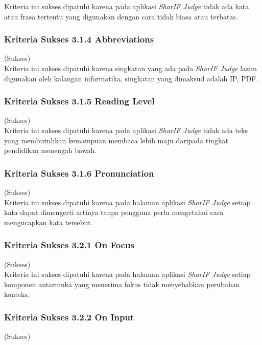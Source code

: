 \documentclass[a4paper,twoside]{article}
\begin{document}
\begin{enumerate}
		Kriteria ini sukses dipatuhi karena pada aplikasi \textit{SharIF Judge} tidak ada kata atau frasa tertentu yang digunakan dengan cara tidak biasa atau terbatas. 
		
		\subsubsection*{Kriteria Sukses 3.1.4 Abbreviations}
		\label{subsubsec:kepatuhan_kriteria_3.1.4}
		(Sukses) \\
		
		Kriteria ini sukses dipatuhi karena singkatan yang ada pada \textit{SharIF Judge} lazim digunakan oleh kalangan informatika, singkatan yang dimaksud adalah IP, PDF.
		
		\subsubsection*{Kriteria Sukses 3.1.5 Reading Level}
		\label{subsubsec:kepatuhan_kriteria_3.1.5}
		(Sukses) \\
		
		Kriteria ini sukses dipatuhi karena pada aplikasi \textit{SharIF Judge} tidak ada teks yang membutuhkan kemampuan membaca lebih maju daripada tingkat pendidikan menengah bawah.
		
		\subsubsection*{Kriteria Sukses 3.1.6 Pronunciation}
		\label{subsubsec:kepatuhan_kriteria_3.1.6}
		(Sukses) \\
		
		Kriteria ini sukses dipatuhi karena pada halaman aplikasi \textit{SharIF Judge} setiap kata dapat dimengerti artinya tanpa pengguna perlu mengetahui cara mengucapkan kata tersebut.
		
		\subsubsection*{Kriteria Sukses 3.2.1 On Focus}
		\label{subsubsec:kepatuhan_kriteria_3.2.1}
		(Sukses) \\
		
		Kriteria ini sukses dipatuhi karena pada halaman aplikasi \textit{SharIF Judge} setiap komponen antarmuka yang menerima fokus tidak menyebabkan perubahan konteks.
		
		\subsubsection*{Kriteria Sukses 3.2.2 On Input}
		\label{subsubsec:kepatuhan_kriteria_3.2.2}
		(Sukses) \\
		

\end{enumerate}
\end{document}

